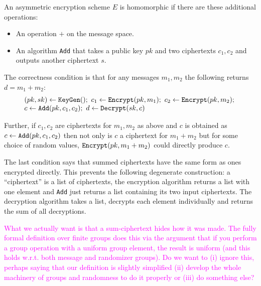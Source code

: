 \documentclass{llncs}
\newcommand{\alg}[1]{\textup{\texttt{#1}}}
\begin{document}
\begin{definition}
An asymmetric encryption scheme $E$ is homomorphic if there are these additional operations:

\begin{itemize}
\item An operation $+$ on the message space.
\item An algorithm \alg{Add} that takes a public key $pk$ and two ciphertexts $c_1, c_2$ and outputs another ciphertext $s$.
\end{itemize}

The correctness condition is that for any messages $m_1, m_2$ the following returns $d = m_1 + m_2$:
\[
\begin{array}{l}
(pk, sk) \gets \alg{KeyGen}();\ 
c_1 \gets \alg{Encrypt}(pk, m_1);\ 
c_2 \gets \alg{Encrypt}(pk, m_2);\ \\
c \gets \alg{Add}(pk, c_1, c_2);\ 
d \gets \alg{Decrypt}(sk, c)
\end{array}
\]

Further, if $c_1, c_2$ are ciphertexts for $m_1, m_2$ as above and $c$ is obtained as $c \gets \alg{Add}(pk, c_1, c_2)$ then not only is $c$ a ciphertext for $m_1 + m_2$ but for some choice of random values, $\alg{Encrypt}(pk, m_1 + m_2)$ could directly produce $c$.
\end{definition}

The last condition says that summed ciphertexts have the same form as ones encrypted directly. This prevents the following degenerate construction: a ``ciphertext'' is a list of ciphertexts, the encryption algorithm returns a list with one element and \alg{Add} just returns a list containing its two input ciphertexts. The decryption algorithm takes a list, decrypts each element individually and returns the sum of all decryptions.

\textcolor{Fuchsia}{What we actually want is that a sum-ciphertext hides how it was made. The fully formal definition over finite groups does this via the argument that if you perform a group operation with a uniform group element, the result is uniform (and this holds w.r.t. both message and randomizer groups). Do we want to (i) ignore this, perhaps saying that our definition is slightly simplified (ii) develop the whole machinery of groups and randomness to do it properly or (iii) do something else?}
\end{document}
